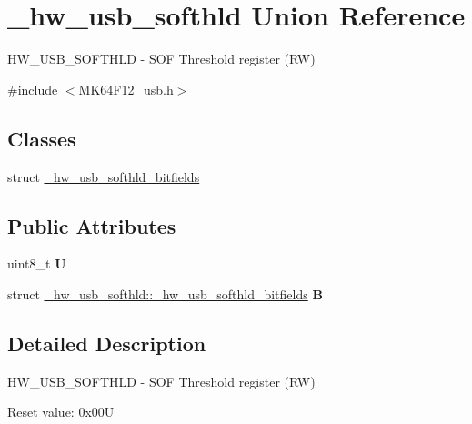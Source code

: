 \hypertarget{union__hw__usb__softhld}{}\section{\+\_\+hw\+\_\+usb\+\_\+softhld Union Reference}
\label{union__hw__usb__softhld}


H\+W\+\_\+\+U\+S\+B\+\_\+\+S\+O\+F\+T\+H\+LD -\/ S\+OF Threshold register (RW)  




{\ttfamily \#include $<$M\+K64\+F12\+\_\+usb.\+h$>$}

\subsection*{Classes}
\begin{DoxyCompactItemize}
\item 
struct \hyperlink{struct__hw__usb__softhld_1_1__hw__usb__softhld__bitfields}{\+\_\+hw\+\_\+usb\+\_\+softhld\+\_\+bitfields}
\end{DoxyCompactItemize}
\subsection*{Public Attributes}
\begin{DoxyCompactItemize}
\item 
uint8\+\_\+t {\bfseries U}\hypertarget{union__hw__usb__softhld_ae9afed6f8a033d65a5756e66ec387ad9}{}\label{union__hw__usb__softhld_ae9afed6f8a033d65a5756e66ec387ad9}

\item 
struct \hyperlink{struct__hw__usb__softhld_1_1__hw__usb__softhld__bitfields}{\+\_\+hw\+\_\+usb\+\_\+softhld\+::\+\_\+hw\+\_\+usb\+\_\+softhld\+\_\+bitfields} {\bfseries B}\hypertarget{union__hw__usb__softhld_a9a02cc4afe8738fbb1272c29cdd1292f}{}\label{union__hw__usb__softhld_a9a02cc4afe8738fbb1272c29cdd1292f}

\end{DoxyCompactItemize}


\subsection{Detailed Description}
H\+W\+\_\+\+U\+S\+B\+\_\+\+S\+O\+F\+T\+H\+LD -\/ S\+OF Threshold register (RW) 

Reset value\+: 0x00U

